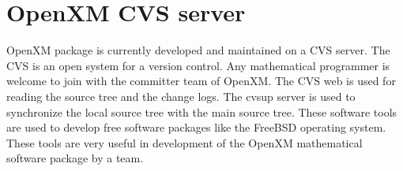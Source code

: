 
\section{OpenXM CVS server}  

OpenXM package is currently developed and maintained on
a CVS server.
The CVS is an open system for a version control.
Any mathematical programmer is welcome to
join with the committer team of OpenXM.
The CVS web is used for reading the source tree and the change logs.
The cvsup server is used to synchronize the local source tree with
the main source tree.
These software tools are used to develop free software packages
like the FreeBSD operating system.
These tools are very useful in development
of the OpenXM mathematical software package by a team.
